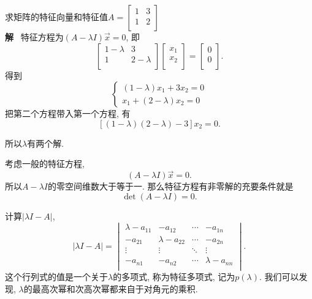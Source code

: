 \begin{example}
    求矩阵的特征向量和特征值$ A = \begin{bmatrix}
     1 & 3\\
     1 & 2\\
    \end{bmatrix}$
    \\
    \textbf{解}
    \
    特征方程为$\left( A - \lambda I \right) \vec{x} = 0$, 即
    \begin{equation}
      \begin{bmatrix}
       1-\lambda & 3\\
       1 & 2-\lambda\\
      \end{bmatrix} \begin{bmatrix}
       x_1\\
       x_2\\
      \end{bmatrix} = \begin{bmatrix}
       0\\
       0\\
      \end{bmatrix}.
    \end{equation}
    得到
    \begin{equation}
          \begin{cases}
        \left( 1 - \lambda \right) x_1 + 3x_2 = 0
        \\
        x_1 + \left( 2-\lambda \right) x_2 = 0
      \end{cases}
    \end{equation}
    把第二个方程带入第一个方程, 有
    \begin{equation}
        \left[ \left( 1 - \lambda \right) \left( 2 - \lambda \right) -3 \right] x_2 = 0.
    \end{equation}

    所以$\lambda$有两个解.
\end{example}

考虑一般的特征方程, 
\begin{equation}
  \left( A - \lambda I \right) \vec{x} = 0.
\end{equation}
所以$A - \lambda I$的零空间维数大于等于一. 那么特征方程有非零解的充要条件就是
\begin{equation}
  \det \left( A - \lambda I \right) = 0.
\end{equation}

计算$\left| \lambda I - A \right| $,
\begin{equation}
    \left| \lambda I - A \right| = \begin{vmatrix}
     \lambda - a_{11} & -a_{12} & \cdots & -a_{1n}\\
     -a_{21} & \lambda - a_{22} & \cdots & -a_{2n}\\
     \vdots & \vdots & \ddots & \vdots\\
     -a_{n1} & -a_{n2} & \cdots & \lambda - a_{nn}\\
    \end{vmatrix}.
\end{equation}
这个行列式的值是一个关于$\lambda$的多项式, 称为特征多项式, 记为$p\left( \lambda \right)$.
我们可以发现, $\lambda$的最高次幂和次高次幂都来自于对角元的乘积.

